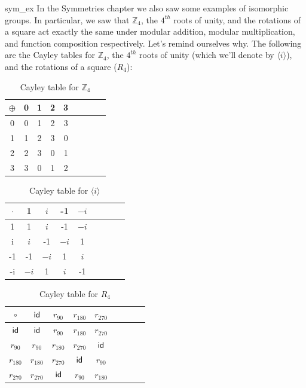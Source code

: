 \begin{example}{sym_ex}
In the Symmetries chapter we also saw some  examples of isomorphic groups.  In particular, we saw that ${\mathbb Z_4}$, the $4^{th}$ roots of unity, and the rotations of a square act exactly the same under modular addition, modular multiplication, and function composition respectively. Let's remind ourselves why. 
The following are the Cayley tables for ${\mathbb Z_4}$, the $4^{th}$ roots of unity (which we'll denote by $\langle i \rangle$), and the rotations of a square ($R_4$):

\begin{table}[H]
\caption{Cayley table for ${\mathbb Z}_4$}
\label{Z4_add_table}
{\small
\begin{center}
\begin{tabular}{c|cccccccc}
$\oplus$ & 0 & 1 & 2 & 3  \\
\hline
0        & 0 & 1 & 2 & 3  \\
1       & 1 & 2 & 3 & 0  \\
2       & 2 & 3 & 0 & 1 \\
3       & 3 & 0 & 1 & 2 \\

\end{tabular}
\end{center}
}
\end{table}

\begin{table}[H]
\caption{Cayley table for $\langle i \rangle$}
\label{4_roots_table}
{\small
\begin{center}
\begin{tabular}{c|cccccccc}
$\cdot$ & 1 &$i$ & -1 & $-i$  \\
\hline
1        & 1 &$i$ & -1 &$-i$  \\
i       &$i$ & -1 & $-i$ & 1  \\
-1       & -1 & $-i$ & 1 & $i$ \\
-i       & $-i$ & 1 & $i$ & -1 \\

\end{tabular}
\end{center}
}
\end{table}

\begin{table}[H]
\caption{Cayley table for $R_4$}
\label{4_rotations_table}
{\small
\begin{center}
\begin{tabular}{c|cccccccc}
$\circ$ & $\sf{id}$ & $r_{90}$ & $r_{180}$ & $r_{270}$  \\
\hline
$\sf{id}$        & $\sf{id}$ & $r_{90}$ & $r_{180}$ & $r_{270}$  \\
$r_{90}$       & $r_{90}$ & $r_{180}$ & $r_{270}$ & $\sf{id}$  \\
$r_{180}$       & $r_{180}$ & $r_{270}$ & $\sf{id}$ & $r_{90}$ \\
$r_{270}$       & $r_{270}$ & $\sf{id}$ & $r_{90}$ & $r_{180}$ \\


\end{tabular}
\end{center}}
\end{table}
\end{example}
